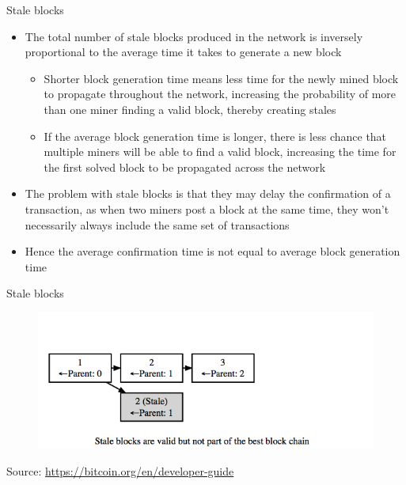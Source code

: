 \documentclass[11pt]{beamer}
\begin{document}
\begin{frame}{Stale blocks}
	\begin{itemize}
		\item The total number of stale blocks produced in the network is inversely proportional to the average time it takes to generate a new block
		\begin{itemize}
			\item Shorter block generation time means less time for the newly mined block to propagate throughout the network, increasing the probability of more than one miner finding a valid block, thereby creating stales
			\item If the average block generation time is longer, there is less chance that multiple miners will be able to find a valid block, increasing the time for the first solved block to be propagated across the network
		\end{itemize}
		\item The problem with stale blocks is that they may delay the confirmation of a transaction, as when two miners post a block at the same time, they won't necessarily always include the same set of transactions
		\item Hence the average confirmation time is not equal to average block generation time
	\end{itemize}
\end{frame}


\begin{frame}{Stale blocks}
	\begin{figure}[]
		\centering
		\includegraphics  [scale=0.4]{Images/stale}
	\end{figure}
	\begin{tiny}
		Source: \href{https://bitcoin.org/en/developer-guide}{https://bitcoin.org/en/developer-guide}
	\end{tiny}
\end{frame}
\end{document}
